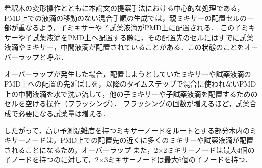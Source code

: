 \begin{algorithm}[tbp]
\begin{algorithmic}[1]
     \State {}
        \Else 
            \State {}
            \Return {}
            \Else 
                \State {}
                        \State {}
                            \State {}
                        \EndIf
                        \State {}
                            \State {}
                        \EndIf 
                        \State {}
                    \EndIf 
                \EndFor 
                \State {}
                \Return {}
            \EndIf
        \EndIf
    \EndFunction 
 \end{algorithmic}
\end{algorithm}

希釈木の変形操作とともに本論文の提案手法における中心的な処理である，PMD上での液滴の移動のない混合手順の生成では，親ミキサーの配置セルの一部が重なるよう，子ミキサーや子試薬液滴がPMD上に配置される．
この子ミキサーや子試薬液滴をPMD上へ配置する際に，その配置先のセルにはすでに試薬液滴やミキサー，中間液滴が配置されていることがある．この状態のことをオーバーラップと呼ぶ．

オーバーラップが発生した場合，配置しようとしていたミキサーや試薬液滴のPMD上への配置の先延ばしを，以降のタイムステップで混合に使われないPMD上の中間液滴を水で洗い流して，他の子ミキサーや子試薬液滴を配置するためのセルを空ける操作（フラッシング）．
フラッシングの回数が増えるほど，試薬合成で必要になる試薬量は増える．

したがって，高い予測混雑度を持つミキサーノードをルートとする部分木内のミキサーノードは，PMD上での配置先の近くに多くのミキサーや試薬液滴が配置されることになるため，オーバーラップ
また，2$\times$2ミキサーノードは最大4個の子ノードを持つのに対して，2$\times$3ミキサーノードは最大6個の子ノードを持つ．

